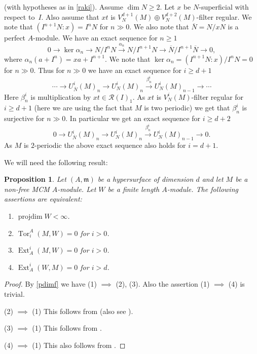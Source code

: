 \documentclass{amsart}
\newcommand{\wrt}{with respect to}
\newcommand{\m}{\mathfrak{m} }
\newcommand{\R}{\mathcal{R} }
\newcommand{\rt}{\rightarrow}
\newcommand{\ov}{\overline}
\newcommand{\projdim}{\operatorname{projdim}}
\newcommand{\Tor}{\operatorname{Tor}}
\newcommand{\Ext}{\operatorname{Ext}}
\theoremstyle{plain}
\newtheorem{proposition}[theorem]{Proposition}
\theoremstyle{definition}
\theoremstyle{remark}
\begin{document}
\s\label{usha} (with hypotheses as in \ref{raki}). Assume $\dim N \geq 2$. Let $x$ be $N$-superficial \wrt \ $I$. Also assume that $xt$ is $V^{d+1}_N(M) \oplus V^{d+2}_N(M)$-filter regular.
 We note that $(I^{n+1}N \colon x) = I^nN$ for $n \gg 0$. We also note that $\ov{N} = N/xN$ is a perfect $A$-module.
We have an exact sequence for $n \geq 1$
\[
 0 \rt \ker \alpha_n \rt N/I^nN \xrightarrow{\alpha_n} N/I^{n+1}N \rt \ov{N}/I^{n+1}\ov{N} \rt 0,
\]
where $\alpha_n(a + I^n) = xa + I^{n+1}$. We note that $\ker \alpha_n  = (I^{n+1}N \colon x)/I^nN = 0$ for $n \gg 0$.  Thus for $n \gg 0$ we have an exact sequence
for $i \geq d+1$
\[
\cdots \rt U^i_{\ov{N}}(M)_n \rt U^i_N(M)_{n} \xrightarrow{\beta^{i}_n} U^i_N(M)_{n-1} \rt \cdots
\]
Here $\beta^{i}_n$ is multiplication by $xt \in \R(I)_1$. As $xt $ is $V^i_N(M)$-filter regular for $i \geq d +1$ (here we are using the fact that $M$ is two periodic) we get that $\beta^{i}_n$ is surjective for $n \gg 0$. In particular we get an exact sequence for $i \geq d +2$
\[
0 \rt U^i_{\ov{N}}(M)_n \rt U^i_N(M)_{n} \xrightarrow{\beta^{i}_n} U^i_N(M)_{n-1} \rt 0.
\]
As $M$ is $2$-periodic the above exact sequence also holds for $i = d+1$.

We will need the following result:
\begin{proposition}
\label{hwm} Let $(A,\m)$ be a hypersurface of dimension $d$ and let $M$ be a non-free MCM $A$-module. Let $W$ be a finite length $A$-module. The following assertions are equivalent:
\begin{enumerate}[\rm (1)]
  \item $\projdim W < \infty$.
  \item $\Tor^A_i(M, W) = 0$ for $i > 0$.
  \item $\Ext_A^i(M, W) = 0$ for $i > 0$.
  \item $\Ext_A^i(W, M) = 0$ for $i > d$.
\end{enumerate}
\end{proposition}
\begin{proof}
By \ref{pdimf} we have (1) $\implies$ (2), (3). Also the assertion (1) $\implies$ (4) is trivial.

 (2) $\implies$ (1) This follows from \cite[1.9]{HW} (also see \cite[1.1]{M}).

 (3) $\implies$ (1) This follows from \cite[5.12]{AB}.

 (4) $\implies$ (1) This also  follows from \cite[5.12]{AB}.
\end{proof}
\end{document}
